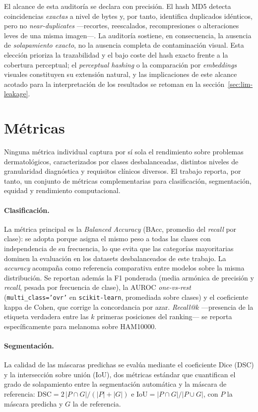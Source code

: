 El alcance de esta auditoría se declara con precisión. El hash MD5
detecta coincidencias \emph{exactas} a nivel de bytes y, por tanto,
identifica duplicados idénticos, pero no \emph{near-duplicates}
---recortes, reescalados, recompresiones o alteraciones leves de una
misma imagen---. La auditoría sostiene, en consecuencia, la ausencia
de \emph{solapamiento exacto}, no la ausencia completa de
contaminación visual. Esta elección prioriza la trazabilidad y el bajo
coste del hash exacto frente a la cobertura perceptual; el
\emph{perceptual hashing} o la comparación por \emph{embeddings}
visuales constituyen su extensión natural, y las implicaciones de este
alcance acotado para la interpretación de los resultados se retoman en
la sección~\ref{sec:lim-leakage}.

\section{Métricas}
\label{sec:metricas}

Ninguna métrica individual captura por sí sola el rendimiento sobre
problemas dermatológicos, caracterizados por clases desbalanceadas,
distintos niveles de granularidad diagnóstica y requisitos clínicos
diversos. El trabajo reporta, por tanto, un conjunto de métricas
complementarias para clasificación, segmentación, equidad y
rendimiento computacional.

\paragraph{Clasificación.}
La métrica principal es la \emph{Balanced Accuracy} (BAcc, promedio
del \emph{recall} por clase): se adopta porque asigna el mismo peso
a todas las clases con independencia de su frecuencia, lo que evita
que las categorías mayoritarias dominen la evaluación en los
datasets desbalanceados de este trabajo. La \emph{accuracy} acompaña
como referencia comparativa
entre modelos sobre la misma distribución. Se reportan además la F1
ponderada (media armónica de precisión y \emph{recall}, pesada por
frecuencia de clase), la AUROC \emph{one-vs-rest}
(\texttt{multi\_class='ovr'} en \texttt{scikit-learn}, promediada
sobre clases) y el coeficiente kappa de Cohen, que corrige la
concordancia por azar. \emph{Recall@$k$} —presencia de la etiqueta
verdadera entre las $k$ primeras posiciones del ranking— se reporta
específicamente para melanoma sobre HAM10000.

\paragraph{Segmentación.}
La calidad de las máscaras predichas se evalúa mediante el
coeficiente Dice (DSC) y la intersección sobre unión (IoU), dos
métricas estándar que cuantifican el grado de solapamiento entre la
segmentación automática y la máscara de referencia:
$\mathrm{DSC} = 2\,|P\cap G|/(|P|+|G|)$ e
$\mathrm{IoU} = |P\cap G|/|P\cup G|$, con $P$ la máscara predicha y
$G$ la de referencia.

